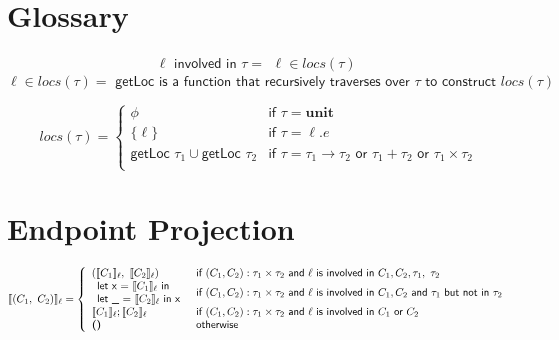 \documentclass{article}
\begin{document}
\section{Glossary}
$$
\ell \textsf{ involved in } \tau = 
    \begin{array}{l}
    \ell \in locs (\tau)
    \end{array}
$$
$$
 \ell \in locs (\tau) = \textsf{ getLoc is a function that recursively traverses over } \tau \textsf{ to construct } locs (\tau)
$$

$$
 locs (\tau) = \left\{
    \begin{array}{ll}
    \phi & \textsf{if } \tau = \textbf{unit}\\
    \{\ell\} & \textsf{if } \tau = \ell.e\\
        \textsf{getLoc } \tau_1 \cup \textsf{getLoc } \tau_2 & \textsf{if } \tau = \tau_1 \to \tau_2 \textsf{ or } \tau_1 + \tau_2 \textsf{ or } \tau_1 \times \tau_2 \\
    \end{array}
\right.
$$

\section{Endpoint Projection}

$$
 \llbracket     (C_1, \ C_2) \rrbracket _\ell = \left\{
    \begin{array}{l l}
    (\llbracket     C_1 \rrbracket _\ell ,\  \llbracket     C_2 \rrbracket _\ell)  & 
    \textsf{if } (C_1, C_2) : \tau_1 \times \tau_2 \textsf{ and } \ell \textsf{ is involved in } C_1,  C_2, \tau_1, \ \tau_2 \\
    \begin{array}{l}
    \textsf{let x = } \llbracket C_1 \rrbracket _\ell \textsf{ in} \\
    \textsf{let \_ = } \llbracket C_2 \rrbracket _\ell \textsf{ in x}
    \end{array} & \textsf{if } (C_1, C_2) : \tau_1 \times \tau_2 \textsf{ and } \ell \textsf{ is involved in } C_1, C_2 \textsf{ and } \tau_1 \textsf{ but not in } \tau_2  \\
    \llbracket     C_1 \rrbracket _\ell; \llbracket     C_2 \rrbracket _\ell & \textsf{if } (C_1, C_2) : \tau_1 \times \tau_2 \textsf{ and } \ell \textsf{ is involved in }  C_1 \textsf{ or }  C_2 \\ 
    \textbf{()} & \textsf{otherwise}
    \end{array}
\right.
$$
\end{document}

